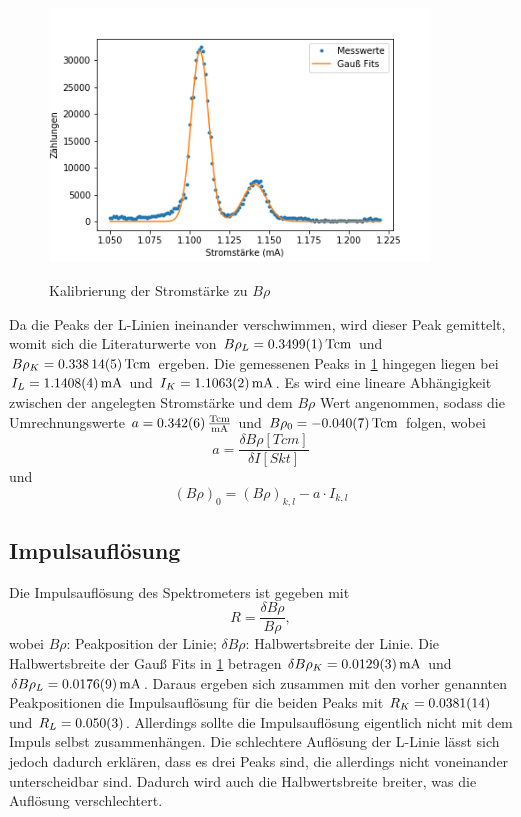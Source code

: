 \begin{figure}[h]
	\centering
	\includegraphics[width=0.9\textwidth]{../Messdaten/Kalibrierung.png}
	\label{Kali}
	\caption{Kalibrierung der Stromstärke zu $B \rho$}
\end{figure}

Da die Peaks der L-Linien ineinander verschwimmen, wird dieser Peak gemittelt, womit sich die Literaturwerte von $B \rho_{L} = \SI{0,3499 \pm 0,0001}{T cm}$ und $B \rho_{K} = \SI{0,33814 \pm 0,00005}{T cm}$ ergeben. Die gemessenen Peaks in \cref{Kali} hingegen liegen bei $I_{L} = \SI{1,1408 \pm 0,0004}{mA}$ und $I_{K} = \SI{1,1063 \pm 0,0002}{mA}$.
Es wird eine lineare Abhängigkeit zwischen der angelegten Stromstärke und dem $B \rho$ Wert angenommen, sodass die Umrechnungswerte $a = \SI{0,342 \pm 0,006}{\frac{T cm}{mA}}$ und $B \rho_{0} = \SI{-0,04 \pm 0,007}{T cm}$ folgen, wobei
\begin{equation}
	a = \frac{\delta B \rho [T cm]}{\delta I [Skt]}
\end{equation}
und 
\begin{equation}
	(B \rho)_{0} = (B \rho)_{k,l} - a \cdot I_{k,l}
\end{equation}

\subsection{Impulsauflösung}
Die Impulsauflösung des Spektrometers ist gegeben mit 
\begin{equation}
	R = \frac{\delta B \rho}{B \rho},
\end{equation}
wobei $B \rho$: Peakposition der Linie; $\delta B \rho$: Halbwertsbreite der Linie.
Die Halbwertsbreite der Gauß Fits in \cref{Kali} betragen $\delta B \rho_{K} = \SI{0,0129 \pm 0,0003}{mA}$ und $\delta B \rho_{L} = \SI{0,0176 \pm 0,0009}{mA}$. Daraus ergeben sich zusammen mit den vorher genannten Peakpositionen die Impulsauflösung für die beiden Peaks mit $R_{K} = \SI{0,0381 \pm 0,0014}{}$ und $R_{L} = \SI{0,050\pm 0,003}{}$. Allerdings sollte die Impulsauflösung eigentlich nicht mit dem Impuls selbst zusammenhängen. Die schlechtere Auflösung der L-Linie lässt sich jedoch dadurch erklären, dass es drei Peaks sind, die allerdings nicht voneinander unterscheidbar sind. Dadurch wird auch die Halbwertsbreite breiter, was die Auflösung verschlechtert.


